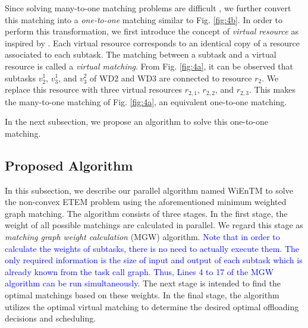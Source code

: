\documentclass[12pt,draftclsnofoot,onecolumn]{IEEEtran}
\begin{document}
Since solving many-to-one matching problems are difficult \cite{b16}, we further convert this matching into a \textit{one-to-one} matching similar to Fig. \ref{fig:4b}. In order to perform this transformation, we first introduce the concept of \textit{virtual resource} as inspired by \cite{b16}. Each virtual resource corresponds to an identical copy of a resource associated to each subtask. The matching between a subtask and a virtual resource is called a \textit{virtual matching}. From Fig. \ref{fig:4a}, it can be observed that subtasks $v_2^1$, $v_3^1$, and $v_3^2$ of WD2 and WD3 are connected to resource $r_2$. We replace this resource with three virtual resources $r_{2,1}$, $r_{2,2}$, and $r_{2,3}$. This makes the many-to-one matching of Fig. \ref{fig:4a}, an equivalent one-to-one matching.

In the next subsection, we propose an algorithm to solve this one-to-one matching.

\subsection{Proposed Algorithm}
In this subsection, we describe our parallel algorithm named WiEnTM to solve the non-convex ETEM problem using the aforementioned minimum weighted graph matching. The algorithm consists of three stages. In the first stage, the weight of all possible matchings are calculated in parallel. We regard this stage as \textit{matching graph weight calculation} (MGW) algorithm. \textcolor{blue}{Note that in order to calculate the weights of subtasks, there is no need to actually execute them. The only required information is the size of input and output of each subtask which is already known from the task call graph. Thus, Lines 4 to 17 of the MGW algorithm can be run simultaneously.} The next stage is intended to find the optimal matchings based on these weights. In the final stage, the algorithm utilizes the optimal virtual matching to determine the desired optimal offloading decisions and scheduling.
\end{document}
